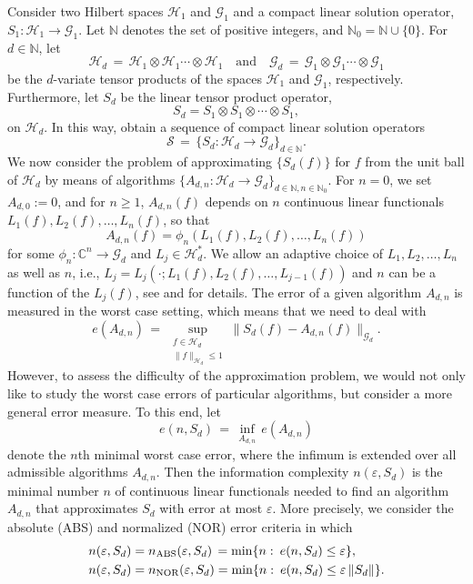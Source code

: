 \documentclass[graybox]{svmult}
\newcommand{\NOR}{\textup{NOR}\xspace}
\newcommand{\ABS}{\textup{ABS}\xspace}
\newcommand{\calG}{{\mathcal{G}}}
\newcommand{\calH}{{\mathcal{H}}}
\newcommand{\calS}{{\mathcal{S}}}
\newcommand{\C}{{\mathbb{C}}} %
\newcommand{\N}{{\mathbb{N}}} %
\newcommand{\fh}[1]{{\color{OliveGreen}{#1}}}
\begin{document}
Consider two Hilbert spaces $\calH_1$ and $\calG_1$ and a 
compact linear solution operator,
$
S_1: \calH_1 \to \calG_1.
$
Let $\N$ denotes the set of positive integers,   
and $\N_0 =\N\cup\{0\}$.  For $d\in \N$, let 
$$
\calH_d\,=\,\calH_1\otimes\calH_1\cdots\otimes\calH_1\quad\mbox{and}\quad
\calG_d\,=\,\calG_1\otimes\calG_1\cdots\otimes\calG_1
$$
be the $d$-variate tensor products of the spaces $\calH_1$ and $\calG_1$, respectively. 
Furthermore, let $S_d$ be the linear tensor product operator,
$$ 
S_d=S_1\otimes S_1\otimes \cdots \otimes S_1,
$$
on $\calH_d$. 
In this way, obtain a sequence of compact    
linear solution operators    
$$   
\calS\,=\, \{S_d: \calH_d \to \calG_d\}_{d \in \N}.     
$$   
We now consider the problem of 
approximating $\{S_d(f)\}$ for $f$ from the   
unit ball of $\calH_d$ by means of algorithms   
$\{A_{d,n}: \calH_d \to \calG_d\}_{d \in \N,n\in\N_0}$.    
For $n=0$, we set $A_{d,0}:=0$, and for $n\ge 1$, $A_{d,n}(f)$    
depends on $n$ continuous    
linear functionals $L_1(f), L_2(f),\ldots, L_n(f)$, so that   
$$   
A_{d,n}(f)=\phi_n(L_1(f),L_2(f),\dots,L_n(f))   
$$   
for some $\phi_n:\C^n\to \calG_d$ and $L_j\in \calH_d^*$.  \fh{Do we consider complex-valued linear functionals?}  
We allow an adaptive choice of $L_1,L_2,\ldots,L_n$ as well as $n$, i.e.,   
$L_j=L_j(\cdot;L_1(f),L_2(f),\dots,L_{j-1}(f))$ and $n$ can be a   
function of the $L_j(f)$,    
see \cite{TWW88} and \cite{NW08} for details.
The error of a given algorithm $A_{d,n}$ is measured in the worst case setting, 
which means that we need to deal with  
$$   
e(A_{d,n})\,=\,\sup_{\substack{f\in\calH_d \\ \|f\|_{\calH_d}\le1}}   
\|S_d(f)-A_{d,n}(f)\|_{\calG_d}.   
$$   
However, to assess the difficulty of the approximation problem, we would not 
only like to study the worst case errors of particular algorithms, but 
consider a more general error measure. To this end, let   
$$   
e(n,S_d)\,=\,\inf_{A_{d,n}}\,e(A_{d,n})   
$$   
denote the $n$th minimal worst case error,    
where the infimum is extended over all admissible algorithms $A_{d,n}$. Then    
the information complexity $n(\varepsilon,S_d)$ is   
the minimal number $n$ of continuous linear functionals    
needed to find an algorithm $A_{d,n}$ that approximates   
$S_d$ with error at most $\varepsilon$. More precisely,    
we consider the absolute (\ABS) and normalized (\NOR) error criteria   
in which    
\begin{align*}   
 n(\varepsilon,S_d)&=n_{\ABS}(\varepsilon, S_d)\, =   
\min\{n\,\colon\,e(n,S_d)\le \varepsilon\},\\   
 n(\varepsilon,S_d)&=n_{\NOR}(\varepsilon,S_d)=   
\min\{n\,\colon\,e(n,S_d) \le \varepsilon\,\|S_d\|\}.   
\end{align*}   
\end{document}
